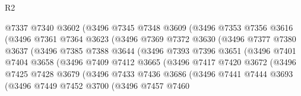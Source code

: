 \begin{lexlean}{R2}
\begin{coremodule}
                      @7337
                      @7340
                      @3602
                      (@3496
                        @7345
                        @7348
                        @3609
                        (@3496
                          @7353
                          @7356
                          @3616
                          (@3496
                            @7361
                            @7364
                            @3623
                            (@3496
                              @7369
                              @7372
                              @3630
                              (@3496
                                @7377
                                @7380
                                @3637
                                (@3496
                                  @7385
                                  @7388
                                  @3644
                                  (@3496
                                    @7393
                                    @7396
                                    @3651
                                    (@3496
                                      @7401
                                      @7404
                                      @3658
                                      (@3496
                                        @7409
                                        @7412
                                        @3665
                                        (@3496
                                          @7417
                                          @7420
                                          @3672
                                          (@3496
                                            @7425
                                            @7428
                                            @3679
                                            (@3496
                                              @7433
                                              @7436
                                              @3686
                                              (@3496
                                                @7441
                                                @7444
                                                @3693
                                                (@3496
                                                  @7449
                                                  @7452
                                                  @3700
                                                  (@3496
                                                    @7457
                                                    @7460

\end{coremodule}
\end{lexlean}
